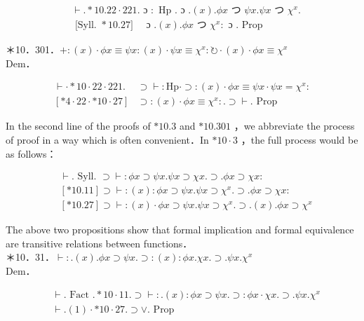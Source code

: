 \documentclass[10pt]{article}
\begin{document}
$$
\begin{aligned}
& \vdash . * 10.22 \cdot 221 . \text { ɔ }: \text { Hp } . \text { ɔ } .(x) . \phi x \text { つ } \psi x . \psi x \text { つ } \chi^{x} . \\
& \text { [Syll. } * 10.27] \quad \text { ɔ } .(x) . \phi x \text { つ } \chi^{x}: \text { ɔ } \text {. Prop }
\end{aligned}
$$

＊10．301．$+:(x) \cdot \phi x \equiv \psi x:(x) \cdot \psi x \equiv \chi^{x}: \circlearrowright \cdot(x) \cdot \phi x \equiv \chi^{x}$\\
Dem．

$$
\begin{aligned}
\vdash \cdot * 10 \cdot 22 \cdot 221 . & \supset \vdash: \mathrm{Hp} \cdot \supset:(x) \cdot \phi x \equiv \psi x \cdot \psi x=\chi^{x}: \\
{[* 4 \cdot 22 \cdot * 10 \cdot 27] } & \supset:(x) \cdot \phi x \equiv \chi^{x}: . \supset \vdash \text {. Prop }
\end{aligned}
$$

In the second line of the proofs of $* 10.3$ and $* 10.301$ ，we abbreviate the process of proof in a way which is often convenient．In $* 10 \cdot 3$ ，the full process would be as follows：

$$
\begin{aligned}
& \vdash . \text { Syll. } \supset \vdash: \phi x \supset \psi x . \psi x \supset \chi x . \supset . \phi x \supset \chi x: \\
& {[* 10.11] \supset \vdash:(x): \phi x \supset \psi x . \psi x \supset \chi^{x} . \supset . \phi x \supset \chi x:} \\
& {[* 10.27] \supset \vdash:(x) \cdot \phi x \supset \psi x . \psi x \supset \chi^{x} . \supset .(x) . \phi x \supset \chi^{x}}
\end{aligned}
$$

The above two propositions show that formal implication and formal equivalence are transitive relations between functions．\\
＊10．31．$\vdash: .(x) . \phi x \supset \psi x . \supset:(x): \phi x . \chi x . \supset . \psi x . \chi^{x}$\\
Dem．


\begin{align*}
& \vdash . \text { Fact } . * 10 \cdot 11 . \supset \vdash: .(x): \phi x \supset \psi x . \supset: \phi x \cdot \chi x . \supset . \psi x . \chi^{x}  \tag{1}\\
& \vdash .(1) \cdot * 10 \cdot 27 . \supset \vee . \text { Prop }
\end{align*}
\end{document}
